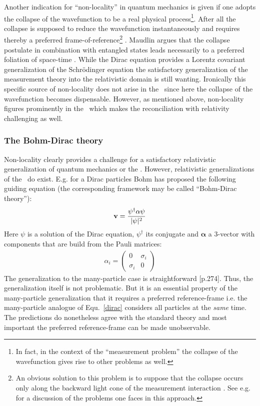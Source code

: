 Another indication for  ``non-locality'' in quantum mechanics is given 
if one  adopts the collapse of the  wavefunction to be a real physical process\footnote{In fact, in the context of the ``measurement
 problem'' the collapse of the wavefunction gives rise to other problems as well.}.
After all the collapse is supposed to reduce the wavefunction instantaneously and requires thereby a preferred 
frame-of-reference\footnote{An obvious solution to this problem is to suppose that the collapse occurs only along the backward 
light cone of the measurement interaction \cite{bloch,hellwig}. See e.g. \cite{barrett04} for a discussion of the problems one 
faces in this approach.} \cite{cushing_qm,maudlin}. Maudlin argues that the collapse postulate 
in combination with entangled states leads necessarily to a preferred foliation of 
space-time \cite[p.297]{maudlin}. 
While the Dirac equation provides a Lorentz covariant generalization of the Schr\"odinger equation
the satisfactory generalization of the measurement theory into the relativistic domain is still wanting.
Ironically this specific source of non-locality does not arise in the \dbb\ since here the 
collapse of the wavefunction becomes dispensable. However, as mentioned above, non-locality  figures prominently in the \dbb\ 
which makes the reconciliation with relativity challenging as well.

\subsubsection{The Bohm-Dirac theory}
Non-locality clearly provides a challenge for a satisfactory relativistic generalization of quantum mechanics or the \dbb.
However, relativistic generalizations of the \dbb\ do exist. E.g. for a Dirac particles Bohm \cite{undivided} has 
proposed the following guiding equation (the corresponding framework may be called ``Bohm-Dirac theory''):
\begin{eqnarray} 
\label{dirac}
{\mathbf v} = { \psi^{\dagger} {\bf {\mathbf \alpha}} \psi\over |\psi|^2}
\end{eqnarray}
Here $\psi$ is a solution of the Dirac equation, $\psi^{\dagger}$ its conjugate and ${\mathbf \alpha}$ a 3-vector with components 
that are build from the Pauli matrices:
\begin{eqnarray} 
\alpha_i=\left ( \begin{array}{cc}         0  & \sigma_i      \\
                                     \sigma_i & 0          \end{array} \right )  
\end{eqnarray}
The generalization to the many-particle case is straightforward \cite{undivided}[p.274].
Thus, the generalization itself is not problematic. But it is an essential property of the many-particle generalization that it  
requires a preferred reference-frame i.e. the many-particle analogue of Equ.~\ref{dirac} considers all particles at the {\em same} time. 
The predictions do nonetheless  agree with the standard theory and most important the preferred reference-frame can be made 
unobservable.


